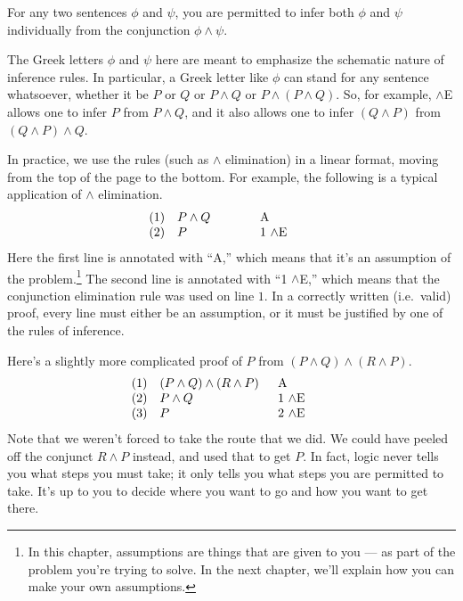 
\bigskip
\begin{tcolorbox}[enhanced,width=10cm,title=conjunction elimination
  ($\wedge$E),attach boxed title to top
  left={yshift=-2mm,xshift=4mm},boxed title style={sharp corners}] For
  any two sentences $\phi$ and $\psi$, you are permitted to infer both
  $\phi$ and $\psi$ individually from the conjunction
  $\phi\wedge \psi$. \end{tcolorbox}

\bigskip 

The Greek letters $\phi$ and $\psi$ here are meant to emphasize the
schematic nature of inference rules.  In particular, a Greek letter
like $\phi$ can stand for any sentence whatsoever, whether it be $P$
or $Q$ or $P\wedge Q$ or $P\wedge (P\wedge Q)$.  So, for example,
$\wedge$E allows one to infer $P$ from $P\wedge Q$, and it also allows
one to infer $(Q\wedge P)$ from $(Q\wedge P)\wedge
Q$. 

In practice, we use the rules (such as $\wedge$ elimination) in a
linear format, moving from the top of the page to the bottom.  For
example, the following is a typical application of $\wedge$
elimination.
\[ \begin{array}{l >{$}p{2cm}<{$} p{1.5cm}}
      (1) & P\wedge Q & A \\
      (2) & P & 1 $\wedge$E
   \end{array} \]
 Here the first line is annotated with ``A,'' which means that it's
 an assumption of the problem.\footnote{In this chapter, assumptions
   are things that are given to you --- as part of the problem you're
   trying to solve.  In the next chapter, we'll
   explain how you can make your own assumptions.}  The second line is annotated with ``1
 $\wedge$E,'' which means that the conjunction elimination rule was used on line
 $1$.  In a correctly written (i.e.\ valid) proof, every line
 must either be an assumption, or it must be justified by one of the
 rules of inference.

Here's a slightly more complicated proof of $P$ from \mbox{$(P\wedge
Q)\wedge (R\wedge P)$}.
\[ \begin{array}{l >{$}p{3cm}<{$} p{1.5cm}}
      (1) & (P\wedge Q)\wedge (R\wedge P) & A \\
     (2) & P\wedge Q & 1 $\wedge$E \\
     (3) & P    & 2 $\wedge$E 
   \end{array} \]
 Note that we weren't forced to take the route that we did.  We could
 have peeled off the conjunct $R\wedge P$ instead, and used that to get
 $P$.  In fact, logic never tells you what steps you must take; it only
 tells you what steps you are permitted to take.  It's up to you to decide
 where you want to go and how you want to get there.
 
